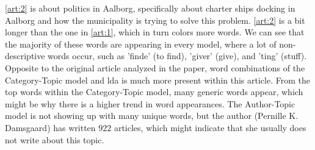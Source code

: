 \autoref{art:2} is about politics in Aalborg, specifically about charter ships docking in Aalborg and how the municipality is trying to solve this problem.
\autoref{art:2} is a bit longer than the one in \autoref{art:1}, which in turn colors more words.
We can see that the majority of these words are appearing in every model, where a lot of non-descriptive words occur, such as 'finde' (to find), 'giver' (give), and 'ting' (stuff). 
Opposite to the original article analyzed in the paper, word combinations of the Category-Topic model and \gls{lda} is much more present within this article.
From the top words within the Category-Topic model, many generic words appear, which might be why there is a higher trend in word appearances.
The Author-Topic model is not showing up with many unique words, but the author (Pernille K. Damsgaard) has written $922$ articles, which might indicate that she usually does not write about this topic.
\\

